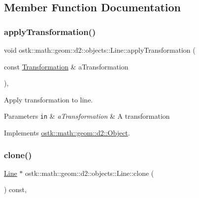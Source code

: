 \subsection{Member Function Documentation}
\mbox{\label{classostk_1_1math_1_1geom_1_1d2_1_1objects_1_1_line_a75088e717153954f56cdd2df2087bdb6}} 
\subsubsection{\texorpdfstring{apply\+Transformation()}{applyTransformation()}}
{\footnotesize\ttfamily void ostk\+::math\+::geom\+::d2\+::objects\+::\+Line\+::apply\+Transformation (\begin{DoxyParamCaption}\item[{const \hyperlink{classostk_1_1math_1_1geom_1_1d2_1_1_transformation}{Transformation} \&}]{a\+Transformation }\end{DoxyParamCaption})\hspace{0.3cm}{\ttfamily [override]}, {\ttfamily [virtual]}}



Apply transformation to line. 


\begin{DoxyParams}[1]{Parameters}
\mbox{\tt in}  & {\em a\+Transformation} & A transformation \\
\hline
\end{DoxyParams}


Implements \hyperlink{classostk_1_1math_1_1geom_1_1d2_1_1_object_a959e50211d7a680f7f904bbb752d75c9}{ostk\+::math\+::geom\+::d2\+::\+Object}.

\mbox{\label{classostk_1_1math_1_1geom_1_1d2_1_1objects_1_1_line_a5c81c1f01b0372c7b0f8e597e77dad92}} 
\subsubsection{\texorpdfstring{clone()}{clone()}}
{\footnotesize\ttfamily \hyperlink{classostk_1_1math_1_1geom_1_1d2_1_1objects_1_1_line}{Line} $\ast$ ostk\+::math\+::geom\+::d2\+::objects\+::\+Line\+::clone (\begin{DoxyParamCaption}{ }\end{DoxyParamCaption}) const\hspace{0.3cm}{\ttfamily [override]}, {\ttfamily [virtual]}}



